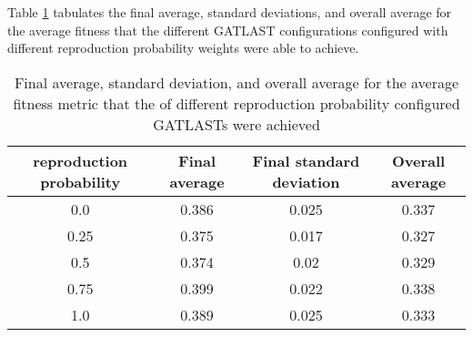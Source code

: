 Table \ref{tab:HP:GA:reproductionProp:average fitness} tabulates the final average, standard deviations, and overall average for the average fitness that the different GATLAST configurations configured with different reproduction probability weights were able to achieve.
\begin{table}[tbh!]
\centering
\begin{adjustbox}{trim=0cm 0cm 0cm 0cm, clip=true}
\begin{tabular}{|c|c|c|c|}
\hline
reproduction probability & Final average & Final standard deviation & Overall average\\
\hline
0.0 & 0.386 & 0.025 & 0.337\\\hline
0.25 & 0.375 & 0.017 & 0.327\\\hline
0.5 & 0.374 & 0.02 & 0.329\\\hline
0.75 & 0.399 & 0.022 & 0.338\\\hline
1.0 & 0.389 & 0.025 & 0.333\\\hline
\end{tabular}
\end{adjustbox}
\caption{Final average, standard deviation, and overall average for the average fitness metric that the of different reproduction probability configured GATLASTs were achieved}
\label{tab:HP:GA:reproductionProp:average fitness}
\end{table}